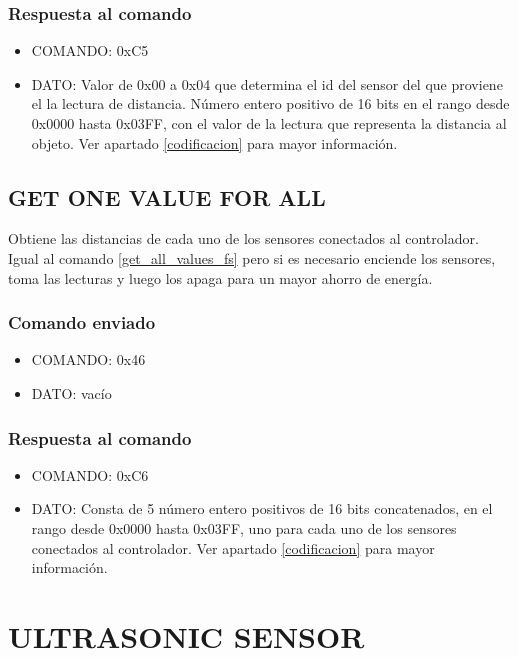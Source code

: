 \documentclass[a4paper,10pt]{article}
\begin{document}
\subsubsection*{Respuesta al comando}

\begin{itemize}
	\item{COMANDO:} 0xC5
	\item{DATO:} Valor de 0x00 a 0x04 que determina el id del sensor del que proviene el la lectura de distancia.
		N\'umero entero positivo de 16 bits en el rango desde 0x0000 hasta 0x03FF, con el valor de la lectura que representa la distancia al objeto.
		Ver apartado \ref{codificacion} para mayor informaci\'on.
\end{itemize}

\subsection{GET ONE VALUE FOR ALL}
\label{get_one_value_for_all_fs}

Obtiene las distancias de cada uno de los sensores conectados al controlador.
Igual al comando \ref{get_all_values_fs} pero si es necesario enciende los sensores, toma las lecturas y luego los apaga para un mayor ahorro de energ\'ia.

\subsubsection*{Comando enviado}

\begin{itemize}
	\item{COMANDO:} 0x46
	\item{DATO:} vac\'io
\end{itemize}

\subsubsection*{Respuesta al comando}

\begin{itemize}
	\item{COMANDO:} 0xC6
	\item{DATO:} Consta de 5 n\'umero entero positivos de 16 bits concatenados, en el rango desde 0x0000 hasta 0x03FF,
		uno para cada uno de los sensores conectados al controlador.
		Ver apartado \ref{codificacion} para mayor informaci\'on.
\end{itemize}

\section{ULTRASONIC SENSOR} 
\label{grupo_ultrasonic_sensor}
\end{document}
